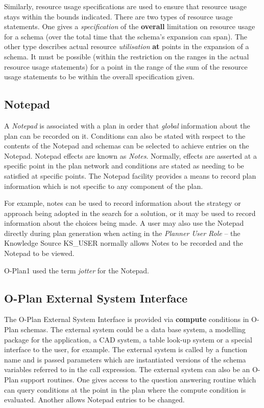 Similarly, resource usage specifications are used to ensure that resource
usage stays within the bounds indicated.  There are two types of resource
usage statements.  One gives a {\em specification} of the {\bf overall}
limitation on resource usage for a schema (over the total time that the
schema's expansion can span).  The other type describes actual resource {\em
utilisation} {\bf at} points in the expansion of a schema.  It must be
possible (within the restriction on the ranges in the actual resource usage
statements) for a point in the range of the sum of the resource usage
statements to be within the overall specification given.

\subsection{Notepad}
 

A {\em Notepad} is associated with a plan in order that {\em global}
information about the plan can be recorded on it.  Conditions can also be
stated with respect to the contents of the Notepad and schemas can be selected
to achieve entries on the Notepad.  Notepad effects are known as {\em Notes}.
Normally, effects are asserted at a specific point in the plan network and
conditions are stated as needing to be satisfied at specific points.  The
Notepad facility provides a means to record plan information which is not
specific to any component of the plan.

For example, notes can be used to record information about the strategy or
approach being adopted in the search for a solution, or it may be used to
record information about the choices being made.  A user may also use the
Notepad directly during plan generation when acting in the {\em Planner
User Role} -- the Knowledge Source KS\_USER normally allows Notes to be
recorded and the Notepad to be viewed.

O-Plan1 used the term {\em jotter} for the Notepad.

\subsection{O-Plan External System Interface}
 

The O-Plan External System Interface is provided via {\bf
compute} conditions in O-Plan schemas.  The external
system could be a data base system, a modelling package for the
application, a CAD system, a table look-up system or a special interface
to the user, for example.  The external system is called by a function
name and is passed parameters which are instantiated versions of the
schema variables referred to in the call expression.  The external
system can also be an O-Plan support routines.  One gives access to
the question answering routine which can query conditions at the point
in the plan where the compute condition is evaluated.  Another allows
Notepad entries to be changed. 


